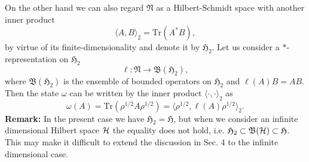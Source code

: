 On the other hand we can also regard $\mathfrak{N}$ as a Hilbert-Schmidt space with another inner product
$$
\langle A, B \rangle_2 =\mbox{Tr}(A^{\ast}B),
$$
by virtue of its finite-dimensionality and denote it by $\mathfrak{H}_2$.
Let us consider a $\ast$-representation on $\mathfrak{H}_2$
\begin{equation}\label{star-rep}
\ell :\mathfrak{N}\to \mathfrak{B}(\mathfrak{H}_2),
\end{equation}
where $\mathfrak{B}(\mathfrak{H}_2)$ is the ensemble of bounded operators on $\mathfrak{H}_2$
and $\ell(A)B=AB$.
Then the state $\omega$ can be written by the inner product $\langle \cdot, \cdot\rangle_2$ as 
$$
\omega(A)=\mbox{Tr}(\rho^{1/2}A\rho^{1/2})=\langle \rho^{1/2},\ell(A)\rho^{1/2}\rangle_2 .
$$
{\bf Remark:} In the present case we have $\mathfrak{H}_2=\mathfrak{H}$, but when we consider an infinite
dimensional Hilbert space ${\cal H}$ the equality does not hold, i.e. $\mathfrak{H}_2\subset \mathfrak{B}({\cal H})\subset \mathfrak{H}$. This may make it difficult to extend the discussion in Sec. 4 to the infinite dimensional case.
